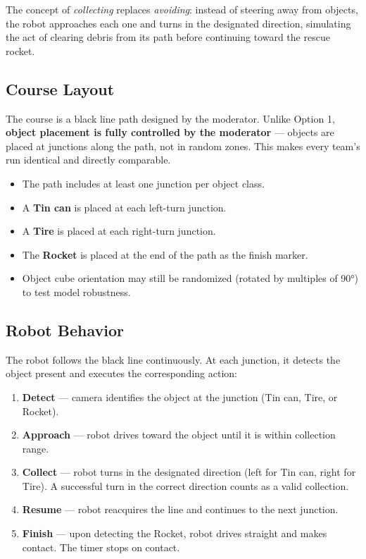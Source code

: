 \documentclass[11pt,a4paper]{article}
\begin{document}
The concept of \textit{collecting} replaces \textit{avoiding}: instead of steering away from objects, the robot approaches each one and turns in the designated direction, simulating the act of clearing debris from its path before continuing toward the rescue rocket.

\subsection{Course Layout}

The course is a black line path designed by the moderator. Unlike Option 1, \textbf{object placement is fully controlled by the moderator} — objects are placed at junctions along the path, not in random zones. This makes every team's run identical and directly comparable.

\begin{itemize}
    \item The path includes at least one junction per object class.
    \item A \textbf{Tin can} is placed at each left-turn junction.
    \item A \textbf{Tire} is placed at each right-turn junction.
    \item The \textbf{Rocket} is placed at the end of the path as the finish marker.
    \item Object cube orientation may still be randomized (rotated by multiples of 90°) to test model robustness.
\end{itemize}

\subsection{Robot Behavior}

The robot follows the black line continuously. At each junction, it detects the object present and executes the corresponding action:

\begin{enumerate}
    \item \textbf{Detect} — camera identifies the object at the junction (Tin can, Tire, or Rocket).
    \item \textbf{Approach} — robot drives toward the object until it is within collection range.
    \item \textbf{Collect} — robot turns in the designated direction (left for Tin can, right for Tire). A successful turn in the correct direction counts as a valid collection.
    \item \textbf{Resume} — robot reacquires the line and continues to the next junction.
    \item \textbf{Finish} — upon detecting the Rocket, robot drives straight and makes contact. The timer stops on contact.
\end{enumerate}
\end{document}

